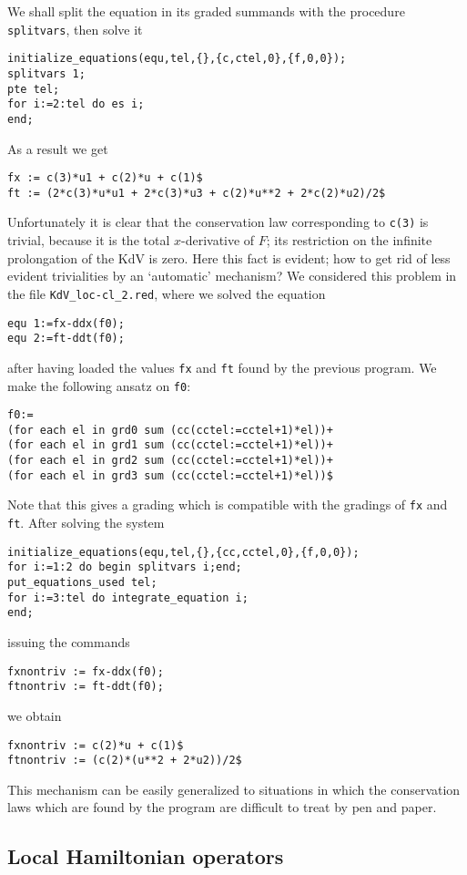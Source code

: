 \documentclass[12pt]{amsart}
\theoremstyle{definition}
\begin{document}
We shall split the equation in its graded summands with the procedure
\texttt{splitvars}, then solve it
\begin{verbatim}
initialize_equations(equ,tel,{},{c,ctel,0},{f,0,0});
splitvars 1;
pte tel;
for i:=2:tel do es i;
end;
\end{verbatim}
As a result we get
\begin{verbatim}
fx := c(3)*u1 + c(2)*u + c(1)$
ft := (2*c(3)*u*u1 + 2*c(3)*u3 + c(2)*u**2 + 2*c(2)*u2)/2$
\end{verbatim}
Unfortunately it is clear that the conservation law corresponding to
\texttt{c(3)} is trivial, because it is the total $x$-derivative of $F$; its
restriction on the infinite prolongation of the KdV is zero. Here this fact is
evident; how to get rid of less evident trivialities by an `automatic'
mechanism? We considered this problem in the file \texttt{KdV\_loc-cl\_2.red},
where we solved the equation
\begin{verbatim}
equ 1:=fx-ddx(f0);
equ 2:=ft-ddt(f0);
\end{verbatim}
after having loaded the values \texttt{fx} and \texttt{ft} found by the
previous program. We make the following ansatz on \texttt{f0}:
\begin{verbatim}
f0:=
(for each el in grd0 sum (cc(cctel:=cctel+1)*el))+
(for each el in grd1 sum (cc(cctel:=cctel+1)*el))+
(for each el in grd2 sum (cc(cctel:=cctel+1)*el))+
(for each el in grd3 sum (cc(cctel:=cctel+1)*el))$
\end{verbatim}
Note that this gives a grading which is compatible with the gradings of
\texttt{fx} and \texttt{ft}. After solving the system
\begin{verbatim}
initialize_equations(equ,tel,{},{cc,cctel,0},{f,0,0});
for i:=1:2 do begin splitvars i;end;
put_equations_used tel;
for i:=3:tel do integrate_equation i;
end;
\end{verbatim}
issuing the commands
\begin{verbatim}
fxnontriv := fx-ddx(f0);
ftnontriv := ft-ddt(f0);
\end{verbatim}
we obtain
\begin{verbatim}
fxnontriv := c(2)*u + c(1)$
ftnontriv := (c(2)*(u**2 + 2*u2))/2$
\end{verbatim}
This mechanism can be easily generalized to situations in which the
conservation laws which are found by the program are difficult to treat by pen
and paper.


\subsection{Local Hamiltonian operators}
\label{sec:local-hamilt-oper}
\end{document}

